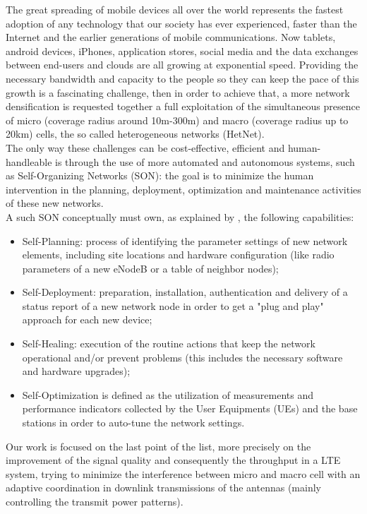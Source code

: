 \documentclass[conference,10pt]{IEEEtran}
\begin{document}
The great spreading of mobile devices all over the world represents the fastest adoption of any technology that
our society has ever experienced, faster than the Internet and the earlier generations of mobile
communications. Now tablets, android devices, iPhones, application stores, social media and the data
exchanges between end-users and clouds are all growing at exponential speed. Providing the necessary bandwidth and capacity to the people so they can keep the pace of this growth is a fascinating challenge, then in order to achieve that, a more network densification is requested together a full exploitation of the simultaneous presence of micro (coverage radius around 10m-300m) and macro (coverage radius up to 20km) cells, the so called heterogeneous networks (HetNet).\\
The only way these challenges can be cost-effective, efficient and human-handleable is through the use of more automated and autonomous systems, such as Self-Organizing Networks (SON): the goal is to minimize the human intervention in the planning, deployment, optimization and maintenance activities of these new networks.\\
A such SON conceptually must own, as explained by \cite{ramiro2011self}, the following capabilities:
\begin{itemize}
\item Self-Planning: process of identifying the parameter settings of new network elements, including site locations and hardware configuration (like radio parameters of a new eNodeB or a table of neighbor nodes);
\item Self-Deployment: preparation, installation, authentication and delivery of a status report of
a new network node in order to get a "plug and play" approach for each new device;
\item Self-Healing: execution of the routine actions that keep the network operational and/or
prevent problems (this includes the necessary software and hardware upgrades);
\item Self-Optimization is defined as the utilization of measurements and performance indicators
collected by the User Equipments (UEs) and the base stations in order to auto-tune the network
settings.
\end{itemize}
Our work is focused on the last point of the list, more precisely on the improvement of the signal quality and consequently the throughput in a LTE system, trying to minimize the interference between micro and macro cell with an adaptive coordination in downlink transmissions of the antennas (mainly controlling the transmit power patterns).\\
\end{document}
